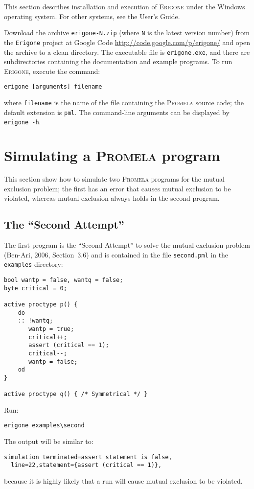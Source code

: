 \documentclass[11pt]{article}
\newcommand*{\prg}{\textsc{Erigone}}
\newcommand*{\prm}{\textsc{Promela}}
\newcommand*{\p}[1]{\texttt{#1}}
\begin{document}
This section describes installation and execution of \prg{} under the
Windows operating system. For other systems, see the User's Guide.

Download the archive \p{erigone-N.zip} (where \p{N} is the latest
version number) from the \p{Erigone} project at Google Code
\url{http://code.google.com/p/erigone/} and open the archive to a clean
directory. The executable file is \p{erigone.exe}, and there are
subdirectories containing the documentation and example programs. To run
\prg{}, execute the command:

\begin{verbatim}
erigone [arguments] filename
\end{verbatim}
where \p{filename} is the name of the file containing the \prm{} source
code; the default extension is \p{pml}. The command-line arguments can
be displayed by \p{erigone -h}.

\section{Simulating a \prm{} program}

This section show how to simulate two \prm{} programs for the mutual
exclusion problem; the first has an error that causes mutual exclusion
to be violated, whereas mutual exclusion always holds in the second
program.

\subsection*{The ``Second Attempt''}

The first program is the ``Second Attempt'' to solve the mutual
exclusion problem (Ben-Ari, 2006, Section~3.6) and is contained in
the file \p{second.pml} in the \p{examples} directory:
\begin{verbatim}
bool wantp = false, wantq = false;
byte critical = 0; 

active proctype p() {
    do 
    :: !wantq;
       wantp = true;
       critical++;
       assert (critical == 1);
       critical--;
       wantp = false;
    od
}

active proctype q() { /* Symmetrical */ }
\end{verbatim}

Run:
\begin{verbatim}
erigone examples\second
\end{verbatim}
The output will be similar to:
\begin{verbatim}
simulation terminated=assert statement is false,
  line=22,statement={assert (critical == 1)},
\end{verbatim}
because it is highly likely that a run will cause mutual exclusion to
be violated.
\end{document}
